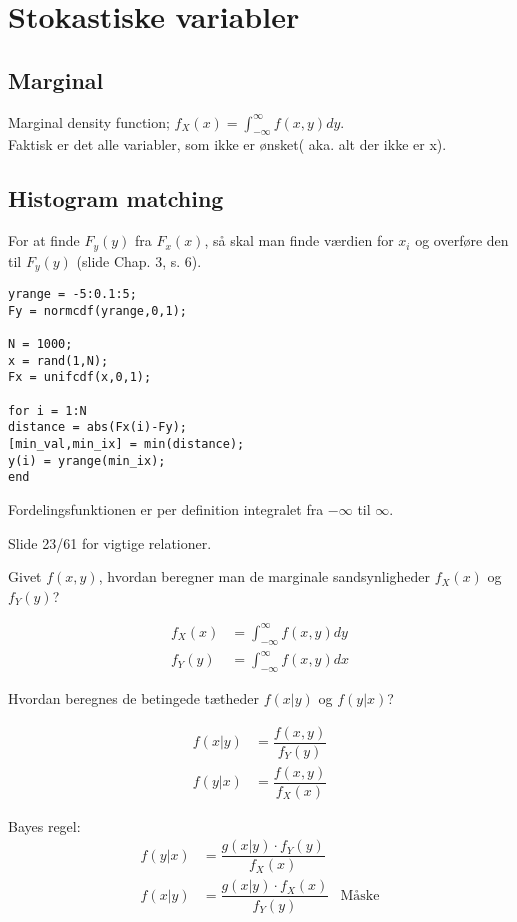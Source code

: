 \documentclass[Main]{subfiles}
\begin{document}
\chapter{Stokastiske variabler}


\section{Marginal}
Marginal density function; $f_X(x) = \int_{-\infty}^{\infty} f(x,y) dy $.
\\
Faktisk er det alle variabler, som ikke er ønsket( aka. alt der ikke er x).

\section{Histogram matching}
For at finde $F_y(y)$ fra $F_x(x)$, så skal man finde værdien for $x_i$ og overføre den til $F_y(y)$ (slide Chap. 3, s. 6).



\begin{lstlisting}[caption=Uniform fordeling med random tal, style=Code-Matlab, label=lst:uni]
yrange = -5:0.1:5;
Fy = normcdf(yrange,0,1);

N = 1000;
x = rand(1,N);
Fx = unifcdf(x,0,1);

for i = 1:N
distance = abs(Fx(i)-Fy);
[min_val,min_ix] = min(distance);
y(i) = yrange(min_ix);
end

\end{lstlisting}

Fordelingsfunktionen er per definition integralet fra $-\infty$ til $\infty $.

Slide 23/61 for vigtige relationer.

Givet $f(x,y)$, hvordan beregner man de marginale
sandsynligheder $f_X(x)$ og $f_Y(y)$?

\begin{align*}
f_X(x) &= \int_{-\infty}^{\infty} f(x,y) dy\\
f_Y(y) &= \int_{-\infty}^{\infty} f(x,y) dx
\end{align*}

Hvordan beregnes de betingede tætheder $f(x|y)$ og $f(y|x)$?

\begin{align*}
f(x|y) &= \dfrac{f(x,y)}{f_Y(y)}\\
f(y|x) &= \dfrac{f(x,y)}{f_X(x)}
\end{align*}

Bayes regel:
\begin{align*}
f(y|x) &= \dfrac{g(x|y) \cdot f_Y(y)}{f_X(x)}\\
f(x|y) &= \dfrac{g(x|y) \cdot f_X(x)}{f_Y(y)} & \text{Måske}
\end{align*} 
\end{document}
